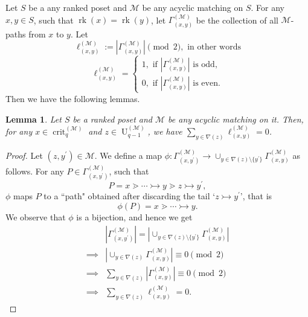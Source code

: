 \documentclass[12pt]{article}
\newtheorem{lemma}[theorem]{Lemma}
\theoremstyle{definition}
\theoremstyle{remark}
\newcommand{\rk}{\operatorname{rk}}
\newcommand{\crit}{\operatorname{crit}}
\newcommand{\up}{\operatorname{U}}
\newcommand{\M}{\mathcal{M}}
\begin{document}
	 	Let $S$ be a any ranked poset and $\M$ be any acyclic matching on $S$.  For any $x,y \in S$, such that $\rk(x)=\rk(y)$, let $\Gamma_{(x,y)}^{(\M)}$ be the collection of all $\M$-paths from $x$ to $y$. Let 
	 	\[\ell^{(\M)}_{(x,y)}:= |\Gamma_{(x,y)}^{(\M)}|  \pmod{2}, \text{ in other words}\]
	 \[\ell^{(\M)}_{(x,y)}= \begin{cases}
	 	1, \text{ if } |\Gamma_{(x,y)}^{(\M)}| \text{ is odd,}\\
	 	0, \text{ if } |\Gamma_{(x,y)}^{(\M)}| \text{ is even}.
	 \end{cases}\]
	 Then we have the following lemmas.
	 \begin{lemma}\label{ft}
	 	Let $S$ be a ranked poset and $\M$ be any acyclic matching on it. Then, for any $x\in \crit_q^{(\M)}$ and $z\in \up_{q-1}^{(\M)}$, we have  $\sum_{y\in \nabla(z)} \ell^{(\M)}_{(x,y)}=0$.
	 \end{lemma}
	 \begin{proof}
	 	Let $(z,y^\prime)\in \M$. We define a map $\phi:\Gamma^{(\M)}_{(x,y^\prime)} \rightarrow \cup_{y\in \nabla(z)\setminus \{y^\prime\}} \Gamma^{(\M)}_{(x,y)}$ as follows. For any $P\in  \Gamma^{(\M)}_{(x,y^\prime)} $, such that 
	 	\[P=x\gtrdot \cdots \rightarrowtail y \gtrdot z \rightarrowtail y^\prime, \]
	 	$\phi$ maps $P$ to a ``path" obtained after discarding the tail `$ z \rightarrowtail y^\prime$', that is
	 	\[\phi(P)= x \gtrdot \cdots \rightarrowtail y.\]
	 We observe that $\phi$ is a bijection, and hence we get
	 	\begin{align*}
	 		& |\Gamma^{(\M)}_{(x,y^\prime)}|=| \cup_{y\in \nabla(z)\setminus \{y^\prime\}}\Gamma^{(\M)}_{(x,y)}|\\
	 		\implies & |\cup_{y\in \nabla(z)} \Gamma_{(x,y)} ^{(\M)}|   \equiv 0 \pmod{2}\\
	 		\implies &  \sum_{y\in \nabla(z)}| \Gamma_{(x,y)}^{(\M)} | \equiv 0 \pmod{2}\\
	 		\implies & \sum_{y\in \nabla(z)} \ell^{(\M)}_{(x,y)}=0.
	 	\end{align*}
	 \end{proof}
    
\end{document}
